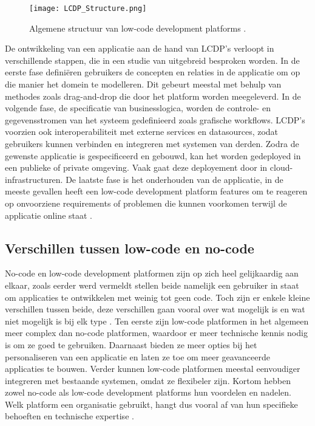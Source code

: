 \begin{figure}[h]
    \centering
    \texttt{[image: LCDP\_Structure.png]}
    \caption[Structuur low-code platforms]{Algemene structuur van low-code development platforms \autocite{Sahay2020}.}
    \label{fig:lcdp_structure}
\end{figure}

De ontwikkeling van een applicatie aan de hand van LCDP's verloopt in verschillende stappen, die in een studie van \textcite{Ruscio2022} uitgebreid besproken worden. In de eerste fase definiëren gebruikers de concepten en relaties in de applicatie om op die manier het domein te modelleren. Dit gebeurt meestal met behulp van methodes zoals drag-and-drop die door het platform worden meegeleverd. In de volgende fase, de specificatie van businesslogica, worden de controle- en gegevensstromen van het systeem gedefinieerd zoals grafische workflows. LCDP's voorzien ook interoperabiliteit met externe services en datasources, zodat gebruikers kunnen verbinden en integreren met systemen van derden. Zodra de gewenste applicatie is gespecificeerd en gebouwd, kan het worden gedeployed in een publieke of private omgeving. Vaak gaat deze deployement door in cloud-infrastructuren. De laatste fase is het onderhouden van de applicatie, in de meeste gevallen heeft een low-code development platform features om te reageren op onvoorziene requirements of problemen die kunnen voorkomen terwijl de applicatie online staat . \\

\subsection{Verschillen tussen low-code en no-code}
\label{subsec:verschillen_low_code}

No-code en low-code development platformen zijn op zich heel gelijkaardig aan elkaar, zoals eerder werd vermeldt stellen beide namelijk een gebruiker in staat om applicaties te ontwikkelen met weinig tot geen code. Toch zijn er enkele kleine verschillen tussen beide, deze verschillen gaan vooral over wat mogelijk is en wat niet mogelijk is bij elk type \autocite{Yan2021}. Ten eerste zijn low-code platformen in het algemeen meer complex dan no-code platformen, waardoor er meer technische kennis nodig is om ze goed te gebruiken. Daarnaast bieden ze meer opties bij het personaliseren van een applicatie en laten ze toe om meer geavanceerde applicaties te bouwen. Verder kunnen low-code platformen meestal eenvoudiger integreren met bestaande systemen, omdat ze flexibeler zijn. Kortom hebben zowel no-code als low-code development platforms hun voordelen en nadelen. Welk platform een organisatie gebruikt, hangt dus vooral af van hun specifieke behoeften en technische expertise \autocite{Yan2021}.


